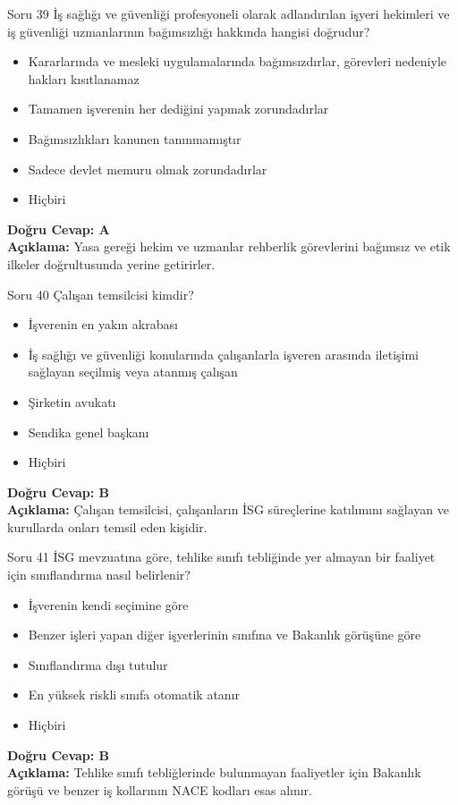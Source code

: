 \documentclass[12pt,a4paper]{article}
\begin{document}
\begin{testcard}{Soru 39}
    İş sağlığı ve güvenliği profesyoneli olarak adlandırılan işyeri hekimleri ve iş güvenliği uzmanlarının bağımsızlığı hakkında hangisi doğrudur?
    \begin{itemize}
        \item[A)] Kararlarında ve mesleki uygulamalarında bağımsızdırlar, görevleri nedeniyle hakları kısıtlanamaz
        \item[B)] Tamamen işverenin her dediğini yapmak zorundadırlar
        \item[C)] Bağımsızlıkları kanunen tanınmamıştır
        \item[D)] Sadece devlet memuru olmak zorundadırlar
        \item[E)] Hiçbiri
    \end{itemize}
    \tcblower
    \textbf{Doğru Cevap: A} \\
    \textbf{Açıklama:} Yasa gereği hekim ve uzmanlar rehberlik görevlerini bağımsız ve etik ilkeler doğrultusunda yerine getirirler.
\end{testcard}

\begin{testcard}{Soru 40}
    Çalışan temsilcisi kimdir?
    \begin{itemize}
        \item[A)] İşverenin en yakın akrabası
        \item[B)] İş sağlığı ve güvenliği konularında çalışanlarla işveren arasında iletişimi sağlayan seçilmiş veya atanmış çalışan
        \item[C)] Şirketin avukatı
        \item[D)] Sendika genel başkanı
        \item[E)] Hiçbiri
    \end{itemize}
    \tcblower
    \textbf{Doğru Cevap: B} \\
    \textbf{Açıklama:} Çalışan temsilcisi, çalışanların İSG süreçlerine katılımını sağlayan ve kurullarda onları temsil eden kişidir.
\end{testcard}

\begin{testcard}{Soru 41}
    İSG mevzuatına göre, tehlike sınıfı tebliğinde yer almayan bir faaliyet için sınıflandırma nasıl belirlenir?
    \begin{itemize}
        \item[A)] İşverenin kendi seçimine göre
        \item[B)] Benzer işleri yapan diğer işyerlerinin sınıfına ve Bakanlık görüşüne göre
        \item[C)] Sınıflandırma dışı tutulur
        \item[D)] En yüksek riskli sınıfa otomatik atanır
        \item[E)] Hiçbiri
    \end{itemize}
    \tcblower
    \textbf{Doğru Cevap: B} \\
    \textbf{Açıklama:} Tehlike sınıfı tebliğlerinde bulunmayan faaliyetler için Bakanlık görüşü ve benzer iş kollarının NACE kodları esas alınır.
\end{testcard}
\end{document}

